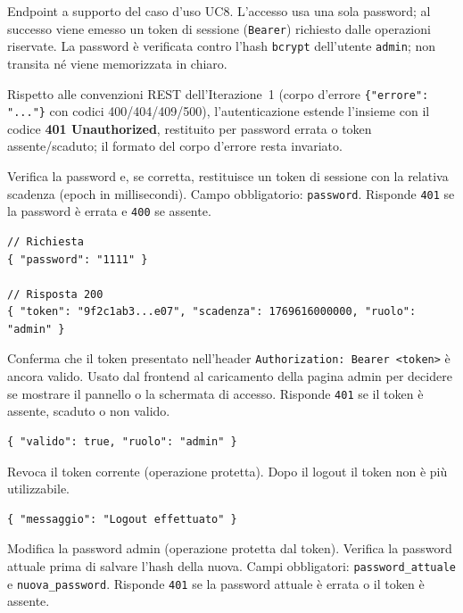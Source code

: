 Endpoint a supporto del caso d'uso UC8. L'accesso usa una sola password; al
successo viene emesso un token di sessione (\texttt{Bearer}) richiesto dalle
operazioni riservate. La password è verificata contro l'hash \texttt{bcrypt}
dell'utente \texttt{admin}; non transita né viene memorizzata in chiaro.

Rispetto alle convenzioni REST dell'Iterazione~1 (corpo d'errore \texttt{\{"errore": "..."\}} con codici 400/404/409/500), l'autenticazione estende l'insieme con il codice \textbf{401 Unauthorized}, restituito per password errata o token assente/scaduto; il formato del corpo d'errore resta invariato.


Verifica la password e, se corretta, restituisce un token di sessione con la
relativa scadenza (epoch in millisecondi). Campo obbligatorio: \texttt{password}.
Risponde \texttt{401} se la password è errata e \texttt{400} se assente.

\begin{lstlisting}[style=json]
// Richiesta
{ "password": "1111" }

// Risposta 200
{ "token": "9f2c1ab3...e07", "scadenza": 1769616000000, "ruolo": "admin" }
\end{lstlisting}


Conferma che il token presentato nell'header \texttt{Authorization: Bearer
<token>} è ancora valido. Usato dal frontend al caricamento della pagina admin
per decidere se mostrare il pannello o la schermata di accesso. Risponde
\texttt{401} se il token è assente, scaduto o non valido.

\begin{lstlisting}[style=json]
{ "valido": true, "ruolo": "admin" }
\end{lstlisting}


Revoca il token corrente (operazione protetta). Dopo il logout il token non è più
utilizzabile.

\begin{lstlisting}[style=json]
{ "messaggio": "Logout effettuato" }
\end{lstlisting}


Modifica la password admin (operazione protetta dal token). Verifica la password
attuale prima di salvare l'hash della nuova. Campi obbligatori:
\texttt{password\_attuale} e \texttt{nuova\_password}. Risponde \texttt{401} se la
password attuale è errata o il token è assente.

